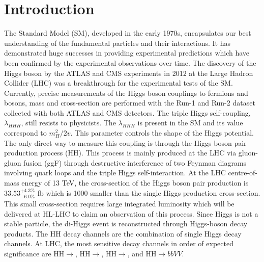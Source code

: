 \newpage
\chapter{Introduction}
\label{Intro}

The Standard Model (SM), developed in the early 1970s, encapsulates our best understanding of the fundamental particles and their interactions. It has demonstrated huge successes in providing experimental predictions which have been confirmed by the experimental observations over time. The discovery of the Higgs boson by the ATLAS and CMS experiments in 2012 at the Large Hadron Collider (LHC) was a breakthrough for the experimental tests of the SM. Currently, precise measurements of the Higgs boson couplings to fermions and bosons, mass and cross-section are performed with the Run-1 and Run-2 dataset collected with both ATLAS and CMS detectors. The triple Higgs self-coupling, $\lambda_{HHH}$, still resists to physicists. The $\lambda_{HHH}$ is present in the SM and its value correspond to $m_{H}^2/2v$. This parameter controls the shape of the Higgs potential. The only direct way to measure this coupling is through the Higgs boson pair production process (HH). This process is mainly produced at the LHC via gluon-gluon fusion (ggF) through destructive interference of two Feynman diagrams involving quark loops and the triple Higgs self-interaction. At the LHC centre-of-mass energy of 13 TeV, the cross-section of the Higgs boson pair production is $33.53_{-6.0\%}^{+4.3\%}$ fb which is 1000 smaller than the single Higgs production cross-section. This small cross-section requires large integrated luminosity which will be delivered at HL-LHC to claim an observation of this process. Since Higgs is not a stable particle, the di-Higgs event is reconstructed through Higgs-boson decay products. The HH decay channels are the combination of single Higgs decay channels. At LHC, the most sensitive decay channels in order of expected significance are HH$\to$\bbtt, HH$\to$\bbyy,  HH$\to$\bbbb, and HH$\to\bar{b}bVV$. \\

